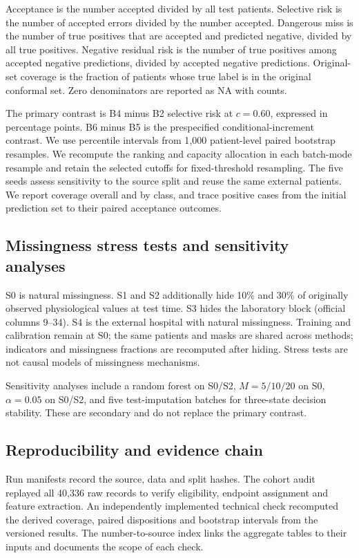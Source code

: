 Acceptance is the number accepted divided by all test patients. Selective risk is the number of accepted errors divided by the number accepted. Dangerous miss is the number of true positives that are accepted and predicted negative, divided by all true positives. Negative residual risk is the number of true positives among accepted negative predictions, divided by accepted negative predictions. Original-set coverage is the fraction of patients whose true label is in the original conformal set. Zero denominators are reported as NA with counts.

The primary contrast is B4 minus B2 selective risk at $c=0.60$, expressed in percentage points. B6 minus B5 is the prespecified conditional-increment contrast. We use percentile intervals from 1{,}000 patient-level paired bootstrap resamples. We recompute the ranking and capacity allocation in each batch-mode resample and retain the selected cutoffs for fixed-threshold resampling. The five seeds assess sensitivity to the source split and reuse the same external patients. We report coverage overall and by class, and trace positive cases from the initial prediction set to their paired acceptance outcomes.

\subsection{Missingness stress tests and sensitivity analyses}

S0 is natural missingness. S1 and S2 additionally hide 10\% and 30\% of originally observed physiological values at test time. S3 hides the laboratory block (official columns 9--34). S4 is the external hospital with natural missingness. Training and calibration remain at S0; the same patients and masks are shared across methods; indicators and missingness fractions are recomputed after hiding. Stress tests are not causal models of missingness mechanisms.

Sensitivity analyses include a random forest on S0/S2, $M=5/10/20$ on S0, $\alpha=0.05$ on S0/S2, and five test-imputation batches for three-state decision stability. These are secondary and do not replace the primary contrast.

\subsection{Reproducibility and evidence chain}

Run manifests record the source, data and split hashes. The cohort audit replayed all 40{,}336 raw records to verify eligibility, endpoint assignment and feature extraction. An independently implemented technical check recomputed the derived coverage, paired dispositions and bootstrap intervals from the versioned results. The number-to-source index links the aggregate tables to their inputs and documents the scope of each check.

